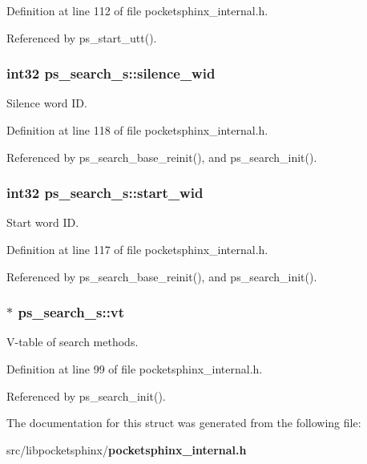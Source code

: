 Definition at line 112 of file pocketsphinx\+\_\+internal.\+h.



Referenced by ps\+\_\+start\+\_\+utt().

\subsubsection[{silence\+\_\+wid}]{\setlength{\rightskip}{0pt plus 5cm}int32 ps\+\_\+search\+\_\+s\+::silence\+\_\+wid}\label{structps__search__s_ab6851b4675f38ab6b3683d75521f000b}


Silence word I\+D. 



Definition at line 118 of file pocketsphinx\+\_\+internal.\+h.



Referenced by ps\+\_\+search\+\_\+base\+\_\+reinit(), and ps\+\_\+search\+\_\+init().

\subsubsection[{start\+\_\+wid}]{\setlength{\rightskip}{0pt plus 5cm}int32 ps\+\_\+search\+\_\+s\+::start\+\_\+wid}\label{structps__search__s_ae1a9fa33bfc851ec91ce96870714b3cc}


Start word I\+D. 



Definition at line 117 of file pocketsphinx\+\_\+internal.\+h.



Referenced by ps\+\_\+search\+\_\+base\+\_\+reinit(), and ps\+\_\+search\+\_\+init().

\subsubsection[{vt}]{$\ast$ ps\+\_\+search\+\_\+s\+::vt}\label{structps__search__s_aa51e88956bbe9c05359d32526180809b}


V-\/table of search methods. 



Definition at line 99 of file pocketsphinx\+\_\+internal.\+h.



Referenced by ps\+\_\+search\+\_\+init().



The documentation for this struct was generated from the following file\+:\begin{DoxyCompactItemize}
\item 
src/libpocketsphinx/{\bf pocketsphinx\+\_\+internal.\+h}\end{DoxyCompactItemize}
